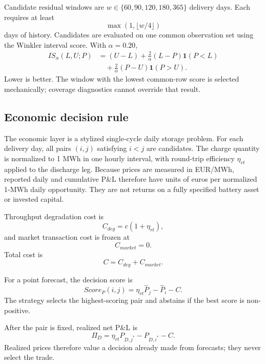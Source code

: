 Candidate residual windows are \(w\in\{60,90,120,180,365\}\) delivery days. Each requires at least
\[
\max(1,\lfloor w/4\rfloor)
\]
days of history. Candidates are evaluated on one common observation set using the Winkler interval score. With \(\alpha=0.20\),
\begin{align}
IS_\alpha(L,U;P)
&=(U-L)
+\frac{2}{\alpha}(L-P)\mathbf{1}(P<L) \nonumber\\
&\quad+\frac{2}{\alpha}(P-U)\mathbf{1}(P>U).
\end{align}
Lower is better. The window with the lowest common-row score is selected mechanically; coverage diagnostics cannot override that result.

\subsection{Economic decision rule}

The economic layer is a stylized single-cycle daily storage problem. For each delivery day, all pairs \((i,j)\) satisfying \(i<j\) are candidates. The charge quantity is normalized to 1 MWh in one hourly interval, with round-trip efficiency \(\eta_{rt}\) applied to the discharge leg. Because prices are measured in EUR/MWh, reported daily and cumulative P\&L therefore have units of euros per normalized 1-MWh daily opportunity. They are not returns on a fully specified battery asset or invested capital.

Throughput degradation cost is
\begin{equation}
C_{deg}=c(1+\eta_{rt}),
\end{equation}
and market transaction cost is frozen at
\[
C_{market}=0.
\]
Total cost is
\begin{equation}
C=C_{deg}+C_{market}.
\end{equation}

For a point forecast, the decision score is
\begin{equation}
Score_P(i,j)=\eta_{rt}\widehat P_j-\widehat P_i-C.
\end{equation}
The strategy selects the highest-scoring pair and abstains if the best score is non-positive.

After the pair is fixed, realized net P\&L is
\begin{equation}
\Pi_D=\eta_{rt}P_{D,j^*}-P_{D,i^*}-C.
\end{equation}
Realized prices therefore value a decision already made from forecasts; they never select the trade.

